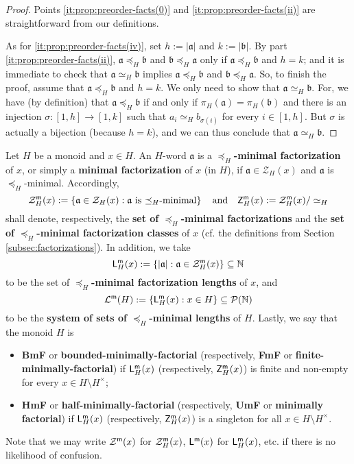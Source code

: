 %
\begin{proof}
Points \ref{it:prop:preorder-facts(0)} and \ref{it:prop:preorder-facts(ii)} are straightforward from our definitions.

As for \ref{it:prop:preorder-facts(iv)}, set $h := |\mathfrak a|$ and $k := |\mathfrak b|$. 
By part \ref{it:prop:preorder-facts(ii)}, $\mathfrak{a} \preceq_H \mathfrak{b}$ and $\mathfrak{b} \preceq_H \mathfrak{a}$ only if  $\mathfrak a \preceq_H \mathfrak b$ and $h = k$; and it is immediate to check that $\mathfrak{a}\simeq_H\mathfrak{b}$ implies $\mathfrak{a} \preceq_H \mathfrak{b}$ and $\mathfrak{b} \preceq_H \mathfrak{a}$. 
So, to finish the proof, assume that $\mathfrak a \preceq_H \mathfrak b$ and $h = k$. We only need to show that $\mathfrak a\simeq_H \mathfrak b$. 
For, we have (by definition) that $\mathfrak a \preceq_H \mathfrak b$ if and only if $\pi_H(\mathfrak a) = \pi_H(\mathfrak b)$ and there is an injection $\sigma: [ 1, h ] \to [ 1, k ]$ 
such that $a_i \simeq_H b_{\sigma(i)}$ for every $i \in [ 1, h ]$. But $\sigma$ is actually a bijection (because $h = k$), and we can thus conclude that $\mathfrak a \simeq_H \mathfrak b$.
\end{proof}
%
\begin{defn}\label{def:min-fac}
Let $H$ be a monoid and $x \in H$. An $H$-word $\mathfrak{a}$ is a \textbf{$\preceq_H$-minimal factorization} of $x$, or simply a \textbf{minimal factorization} of $x$ (in $H$), if $\mathfrak a \in \mathcal Z_H(x)$ and $\mathfrak a$ is $\preceq_H$-minimal. Accordingly, 
\[
\mathcal{Z}_{H}^{\mathsf{m}}(x) := \left\{ \mathfrak{a}\in \mathcal{Z}_H(x): \mathfrak{a} \textrm{ is $\preceq_H$-minimal} \right\}
\quad\text{and}\quad
\mathsf{Z}_{H}^{\mathsf{m}}(x):= \mathcal{Z}_{H}^{\mathsf{m}}(x)/\simeq_H
\]
shall denote, respectively, the \textbf{set of $\preceq_H$-minimal factorizations} and the \textbf{set of $\preceq_H$-minimal factorization classes} of $x$ (cf. the definitions from Section \ref{subsec:factorizations}). In addition, we take 
\[
\mathsf{L}_{H}^{\mathsf{m}}(x) := \left\{ |\mathfrak{a}| : \mathfrak{a} \in \mathcal{Z}_{H}^{\mathsf{m}}(x) \right\} \subseteq \mathbb{N}
\]
to be the set of \textbf{$\preceq_H$-minimal factorization lengths} of $x$, and
\[
	\mathcal{L}^{\mathsf{m}}(H) := \left\{ \mathsf{L}_{H}^{\mathsf{m}}(x) : x\in H \right\} \subseteq \mathcal P(\mathbb{N})
\]
to be the \textbf{system of sets of $\preceq_H$-minimal lengths} of $H$. Lastly, we say that the monoid $H$ is
\begin{itemize}
	\item \textbf{BmF} or \textbf{bounded-minimally-factorial} (respectively, \textbf{FmF} or \textbf{finite-minimally-factorial}) if $\mathsf{L}_{H}^{\mathsf{m}}(x)$ (respectively, $\mathsf{Z}_{H}^{\mathsf{m}}(x)$) is finite and non-empty for every $x\in H\setminus H^\times$;
	
	\item \textbf{HmF} or \textbf{half-minimally-factorial} (respectively, \textbf{UmF} or \textbf{minimally factorial}) if $\mathsf{L}_{H}^{\mathsf{m}}(x)$ (respectively, $\mathsf{Z}_{H}^{\mathsf{m}}(x)$) is a singleton for all $x \in H \setminus H^\times$.
\end{itemize}
%
Note that we may write $\mathcal{Z}^{\mathsf{m}}(x)$ for $\mathcal{Z}_{H}^{\mathsf{m}}(x)$, $\mathsf {L}^{\mathsf{m}}(x)$ for $\mathsf {L}_{H}^{\mathsf{m}}(x)$, etc. if there is no likelihood of confusion.
\end{defn}
